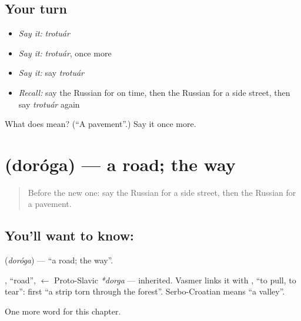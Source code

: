 \subsection*{Your turn}
\begin{itemize}
\raggedright
  \item \emph{Say it:} \emph{trotuár}
  \item \emph{Say it:} \emph{trotuár}, once more
  \item \emph{Say it:} say \emph{trotuár}
  \item \emph{Recall:} say the Russian for on time, then the Russian for a side street, then say \emph{trotuár} again
\end{itemize}

\begin{tcolorbox}[breakable,colback=teal!4,colframe=teal!35!black,title={Before you move on}]
What does  mean? (\textquotedblleft{}A pavement\textquotedblright{}.) Say it once more.
\end{tcolorbox}
\section[\texorpdfstring{\ru{дорога} (doróga)}{дорога (doróga)}]{ (doróga) — a road; the way}

\label{lesson:RU-C183-doroga}



\begin{quote}
Before the new one: say the Russian for a side street, then the Russian for a pavement.
\end{quote}

\subsection*{You'll want to know: }
\textbf{} (\emph{doróga}) — \textquotedblleft{}a road; the way\textquotedblright{}.

\begin{cousinweb}
\textbf{}, \textquotedblleft{}road\textquotedblright{}, $\leftarrow$ Proto-Slavic \emph{*dorga} — inherited. Vasmer links it with \emph{}, \textquotedblleft{}to pull, to tear\textquotedblright{}: first \textquotedblleft{}a strip torn through the forest\textquotedblright{}. Serbo-Croatian \emph{} means \textquotedblleft{}a valley\textquotedblright{}.
\end{cousinweb}

\begin{grammarlens}[title={What you've built}]
One more word for this chapter.
\end{grammarlens}

